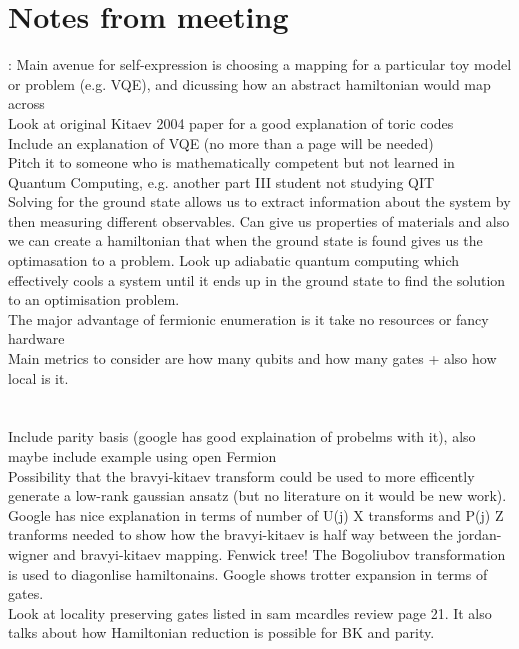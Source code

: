 \documentclass[twoside]{article}
\begin{document}
\section{Notes from meeting}:
Main avenue for self-expression is choosing a mapping for a particular toy model or problem (e.g. VQE), and dicussing how an abstract hamiltonian would map across\\
Look at original Kitaev 2004 paper for a good explanation of toric codes\\
Include an explanation of VQE (no more than a page will be needed)\\
Pitch it to someone who is mathematically competent but not learned in Quantum Computing, e.g. another part III student not studying QIT\\
Solving for the ground state allows us to extract information about the system by then measuring different observables. Can give us properties of materials and also we can create a hamiltonian that when the ground state is found gives us the optimasation to a problem. Look up adiabatic quantum computing which effectively cools a system until it ends up in the ground state to find the solution to an  optimisation problem.\\
The major advantage of fermionic enumeration is it take no resources or fancy hardware\\
Main metrics to consider are how many qubits and how many gates + also how local is it.\\
\\\\
Include parity basis (google has good explaination of probelms with it), also maybe include example using open Fermion\\
Possibility that the bravyi-kitaev transform could be used to more efficently generate a low-rank gaussian ansatz (but no literature on it would be new work). Google has nice explanation in terms of number of U(j) X transforms and P(j) Z tranforms needed to show how the bravyi-kitaev is half way between the jordan-wigner and bravyi-kitaev mapping. Fenwick tree! The Bogoliubov transformation is used to diagonlise hamiltonains. Google shows trotter expansion in terms of gates.\\
Look at locality preserving gates listed in sam mcardles review page 21. It also talks about how Hamiltonian reduction is possible for BK and parity.
\end{document}
